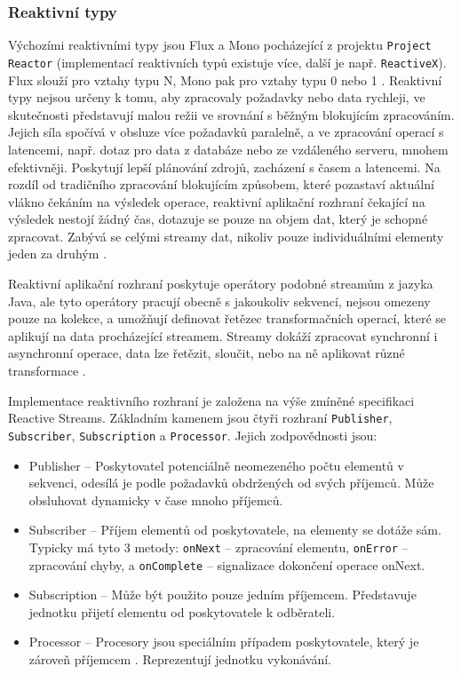 \subsubsection{Reaktivní typy}
Výchozími reaktivními typy jsou Flux a Mono pocházející z projektu \texttt{Project Reactor} (implementací reaktivních typů existuje více, další je např. \texttt{ReactiveX}). Flux slouží pro vztahy typu N, Mono pak pro vztahy typu 0 nebo 1 \cite{projectReactor}.
Reaktivní typy nejsou určeny k tomu, aby zpracovaly požadavky nebo data rychleji, ve skutečnosti představují malou režii ve srovnání s běžným blokujícím zpracováním. Jejich síla spočívá v obsluze více požadavků paralelně, a ve zpracování operací s latencemi, např. dotaz pro data z databáze nebo ze vzdáleného serveru, mnohem efektivněji. Poskytují lepší plánování zdrojů, zacházení s časem a latencemi. Na rozdíl od tradičního zpracování blokujícím způsobem, které pozastaví aktuální vlákno čekáním na výsledek operace, reaktivní aplikační rozhraní čekající na výsledek nestojí žádný čas, dotazuje se pouze na objem dat, který je schopné zpracovat. Zabývá se celými streamy dat, nikoliv pouze individuálními elementy jeden za druhým \cite{springReactiveTypes}.

Reaktivní aplikační rozhraní poskytuje operátory podobné streamům z jazyka Java, ale tyto operátory pracují obecně s jakoukoliv sekvencí, nejsou omezeny pouze na kolekce, a umožňují definovat řetězec transformačních operací, které se aplikují na data procházející streamem. Streamy dokáží zpracovat synchronní i asynchronní operace, data lze řetězit, sloučit, nebo na ně aplikovat různé transformace \cite{springReactiveTypes}.

Implementace reaktivního rozhraní je založena na výše zmíněné specifikaci Reactive Streams. Základním kamenem jsou čtyři rozhraní \texttt{Publisher}, \texttt{Subscriber}, \texttt{Subscription} a \texttt{Processor}. Jejich zodpovědnosti jsou:
\begin{itemize}
    \item Publisher -- Poskytovatel potenciálně neomezeného počtu elementů v sekvenci, odesílá je podle požadavků obdržených od svých příjemců. Může obsluhovat dynamicky v čase mnoho příjemců.
    
    \item Subscriber -- Příjem elementů od poskytovatele, na elementy se dotáže sám. Typicky má tyto 3 metody: \texttt{onNext} -- zpracování elementu, \texttt{onError} -- zpracování chyby, a \texttt{onComplete} -- signalizace dokončení operace onNext.
    
    \item Subscription -- Může být použito pouze jedním příjemcem. Představuje jednotku přijetí elementu od poskytovatele k odběrateli.
    
    \item Processor -- Procesory jsou speciálním případem poskytovatele, který je zároveň příjemcem \cite{reactoreRefGuide}. Reprezentují jednotku vykonávání.
\end{itemize}


